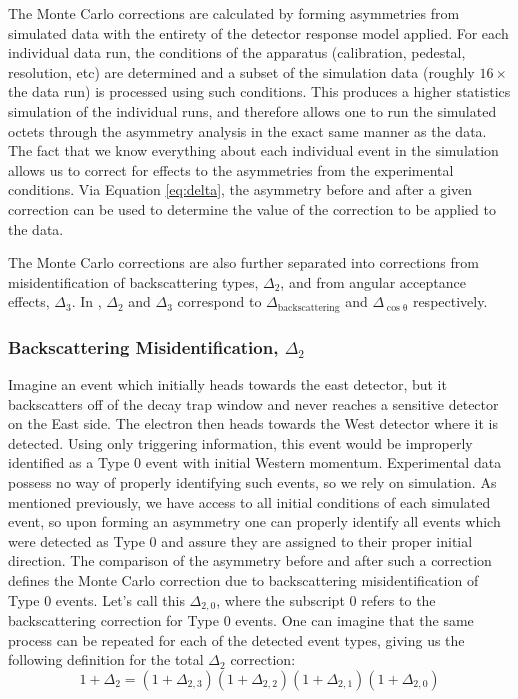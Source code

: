 The Monte Carlo corrections are calculated by forming asymmetries from simulated data with
the entirety of the detector response model applied. For each individual data run, the
conditions of the apparatus (calibration, pedestal, resolution, etc) are determined
and a subset of the simulation data (roughly $16 \times $ the data run) is processed
using such conditions. This produces a higher statistics simulation of the individual runs,
and therefore allows one to run the simulated octets through the asymmetry analysis in
the exact same manner as the data. The fact that we know everything about each individual
event in the simulation allows us to correct for effects to the asymmetries from
the experimental conditions. Via Equation \ref{eq:delta}, the asymmetry before and after
a given correction can be used to determine the value of the correction to be applied to the
data.

The Monte Carlo corrections are also further separated into corrections from misidentification
of backscattering types, $\Delta_{2}$, and from angular acceptance effects, $\Delta_{3}$.
In \cite{UCNA2017}, $\Delta_{2}$ and $\Delta_{3}$ correspond to $\Delta_{\mathrm{backscattering}}$ and
$\Delta_{\mathrm{\cos\theta}}$ respectively.

\subsubsection{Backscattering Misidentification, $\Delta_{2}$}
Imagine an event which initially heads towards the east detector, but it backscatters
off of the decay trap window and never reaches a sensitive detector on the East side. The
electron then heads towards the West detector where it is detected. Using only triggering
information, this event would be improperly identified as a Type 0 event with initial Western
momentum. Experimental data possess no way of properly identifying such events, so we rely
on simulation. As mentioned previously, we have access to all initial conditions of each simulated event,
so upon forming an asymmetry one can properly identify all events which were detected as Type 0
and assure they are assigned to their proper initial direction. The comparison of the asymmetry
before and after such a correction defines the Monte Carlo correction due to backscattering
misidentification of Type 0 events. Let's call this $\Delta_{2,0}$, where the subscript 0 refers
to the backscattering correction for Type 0 events. One can imagine that the same process can
be repeated for each of the detected event types, giving us the following definition for
the total $\Delta_{2}$ correction:
%
\begin{equation}
1+\Delta_{2} = (1+\Delta_{2,3})(1+\Delta_{2,2})(1+\Delta_{2,1})(1+\Delta_{2,0})
\end{equation}


